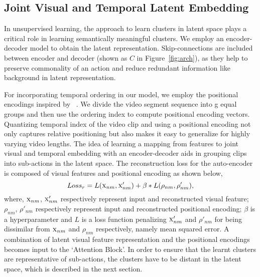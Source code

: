\documentclass[final]{cvpr}
\begin{document}
\subsection{Joint Visual and Temporal Latent Embedding}
\label{sec:jvtl}
\par In unsupervised learning, the approach to learn clusters in latent space plays a critical role in learning semantically meaningful clusters.
We employ an encoder-decoder model to obtain the latent representation.
Skip-connections are included between encoder and decoder (shown as $C$ in Figure~\ref{fig:arch}), as they help to preserve commonality of an action and reduce redundant information like background in latent representation.

For incorporating temporal ordering in our model, we employ the positional encodings inspired by ~\cite{vaswani2017attention}.
We divide the video segment sequence into g equal groups and then use the ordering index to compute positional encoding vectors. Quantizing  temporal index of the video clip and using a positional encoding not only captures relative positioning but also makes it easy to generalize for highly varying video lengths. The idea of learning a mapping from features to joint visual and temporal embedding with an encoder-decoder aids in grouping clips into sub-actions in the latent space. The reconstruction loss for the auto-encoder is composed of visual features and positional encoding as shown below,
\begin{equation}
    Loss_{r} = L(\textsc{x}_{nm}, \textsc{x}'_{nm}) + \beta * L(\rho_{nm}, \rho'_{nm}), 
\end{equation}
where, $\textsc{x}_{nm}$, $\textsc{x}'_{nm}$ respectively represent input and  reconstructed visual feature; $\rho_{nm}$, $\rho'_{nm}$ respectively represent input and reconstructed positional encoding; $\beta$ is a hyperparameter and  $L$ is a loss function penalizing $\textsc{x}'_{nm}$ and $\rho'_{nm}$ for being dissimilar from $\textsc{x}_{nm}$ and $\rho_{nm}$ respectively, namely mean squared error. A combination of latent visual feature representation and the positional encodings becomes input to the `Attention Block'. In order to ensure that the learnt clusters are representative of sub-actions, the clusters have to be distant in the latent space, which is described in the next section.
\end{document}
